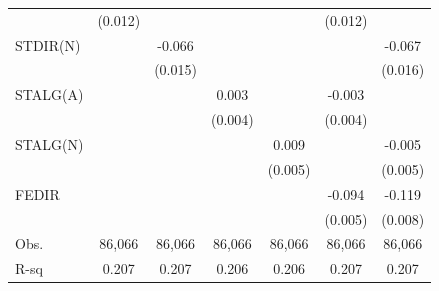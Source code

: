 {\begin{tabular}{l*{6}{c}}
                    &     (0.012)         &                     &                     &                     &     (0.012)         &                     \\
\addlinespace
STDIR(N)            &                     &      -0.066\sym{***}&                     &                     &                     &      -0.067\sym{***}\\
                    &                     &     (0.015)         &                     &                     &                     &     (0.016)         \\
\addlinespace
STALG(A)            &                     &                     &       0.003         &                     &      -0.003         &                     \\
                    &                     &                     &     (0.004)         &                     &     (0.004)         &                     \\
\addlinespace
STALG(N)            &                     &                     &                     &       0.009\sym{*}  &                     &      -0.005         \\
                    &                     &                     &                     &     (0.005)         &                     &     (0.005)         \\
\addlinespace
FEDIR               &                     &                     &                     &                     &      -0.094\sym{***}&      -0.119\sym{***}\\
                    &                     &                     &                     &                     &     (0.005)         &     (0.008)         \\
\midrule
Obs.                &      86,066         &      86,066         &      86,066         &      86,066         &      86,066         &      86,066         \\
R-sq                &       0.207         &       0.207         &       0.206         &       0.206         &       0.207         &       0.207         \\
\bottomrule
\end{tabular}
}
